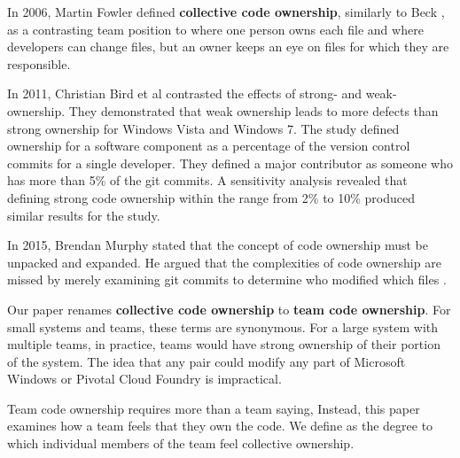 In 2006, Martin Fowler defined \textbf{collective code ownership}, similarly to Beck \cite{FowlerCodeOwnership}, as a contrasting team position to  where one person owns each file and  where developers can change files, but an owner keeps an eye on files for which they are responsible. 

In 2011, Christian Bird et al \cite{BirdDontTouchMyCode} contrasted the effects of strong- and weak-ownership. They demonstrated that weak ownership leads to more defects than strong ownership for Windows Vista and Windows 7. The study defined ownership for a software component as a percentage of the version control commits for a single developer. They defined a major contributor as someone who has more than 5\% of the git commits. A sensitivity analysis revealed that defining strong code ownership within the range from 2\% to 10\% produced similar results for the study.

In 2015, Brendan Murphy stated that the concept of code ownership must be unpacked and expanded. He argued that the complexities of code ownership are missed by merely examining git commits to determine who modified which files \cite{MurphyIEEESoftware}.

Our paper renames \textbf{collective code ownership} to \textbf{team code ownership}. For small systems and teams, these terms are synonymous. For a large system with multiple teams, in practice, teams would have strong ownership of their portion of the system. The idea that any pair could modify any part of Microsoft Windows or Pivotal Cloud Foundry is impractical.

Team code ownership requires more than a team saying,  Instead, this paper examines how a team feels that they own the code. We define  as the degree to which individual members of the team feel collective ownership.  


